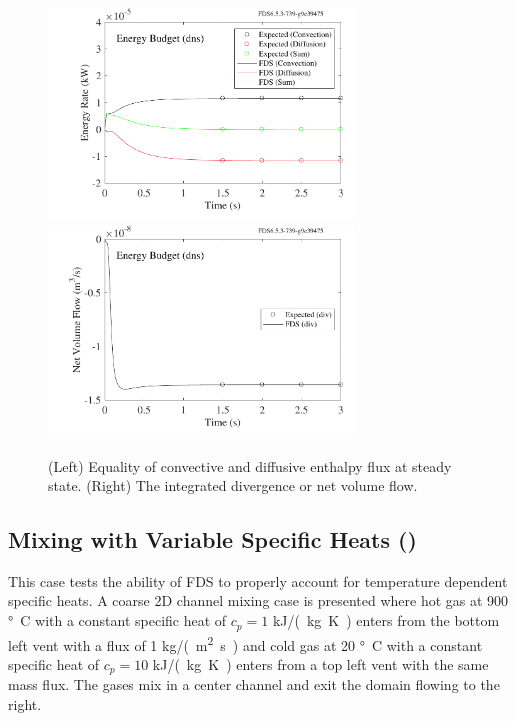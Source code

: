 \documentclass[11pt]{book}
\begin{document}
\begin{figure}[ht]
\includegraphics[width=3.2in]{SCRIPT_FIGURES/energy_budget_dns_heat}
\includegraphics[width=3.2in]{SCRIPT_FIGURES/energy_budget_dns_div}
\caption[The  test case]{(Left) Equality of convective and diffusive enthalpy flux at steady state. (Right) The integrated divergence or net volume flow.}
\label{energy_budget_dns}
\end{figure}



\subsection{Mixing with Variable Specific Heats (\texorpdfstring{}{energy\_budget\_tmix})}
\label{energy_budget_tmix}

This case tests the ability of FDS to properly account for temperature dependent specific heats.  A coarse 2D channel mixing case is presented where hot gas at 900 \si{\degree C} with a constant specific heat of $c_p=1$ \si{kJ/(kg.K)} enters from the bottom left vent with a flux of 1 \si{kg/(m^2.s)} and cold gas at 20 \si{\degree C} with a constant specific heat of $c_p=10$ \si{kJ/(kg.K)} enters from a top left vent with the same mass flux.  The gases mix in a center channel and exit the domain flowing to the right.
\end{document}
